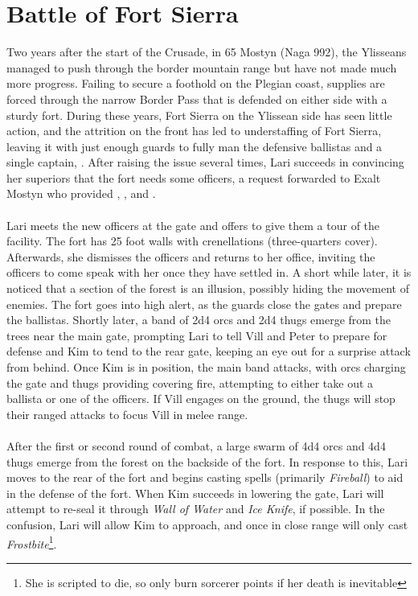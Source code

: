 \section{Battle of Fort Sierra}

Two years after the start of the Crusade, in 65 Mostyn (Naga 992), the Ylisseans managed to push through the border mountain range but have not made much more progress. Failing to secure a foothold on the Plegian coast, supplies are forced through the narrow Border Pass that is defended on either side with a sturdy fort. During these years, Fort Sierra on the Ylissean side has seen little action, and the attrition on the front has led to understaffing of Fort Sierra, leaving it with just enough guards to fully man the defensive ballistas and a single captain, . After raising the issue several times, Lari succeeds in convincing her superiors that the fort needs some officers, a request forwarded to Exalt Mostyn who provided , , and . \\
\\
Lari meets the new officers at the gate and offers to give them a tour of the facility. The fort has 25 foot walls with crenellations (three-quarters cover). Afterwards, she dismisses the officers and returns to her office, inviting the officers to come speak with her once they have settled in. A short while later, it is noticed that a section of the forest is an illusion, possibly hiding the movement of enemies. The fort goes into high alert, as the guards close the gates and prepare the ballistas. Shortly later, a band of 2d4 orcs and 2d4 thugs emerge from the trees near the main gate, prompting Lari to tell Vill and Peter to prepare for defense and Kim to tend to the rear gate, keeping an eye out for a surprise attack from behind. Once Kim is in position, the main band attacks, with orcs charging the gate and thugs providing covering fire, attempting to either take out a ballista or one of the officers. If Vill engages on the ground, the thugs will stop their ranged attacks to focus Vill in melee range.\\
\\
After the first or second round of combat, a large swarm of 4d4 orcs and 4d4 thugs emerge from the forest on the backside of the fort. In response to this, Lari moves to the rear of the fort and begins casting spells (primarily \textit{Fireball}) to aid in the defense of the fort. When Kim succeeds in lowering the gate, Lari will attempt to re-seal it through \textit{Wall of Water} and \textit{Ice Knife}, if possible. In the confusion, Lari will allow Kim to approach, and once in close range will only cast \textit{Frostbite}\footnote{She is scripted to die, so only burn sorcerer points if her death is inevitable}. 